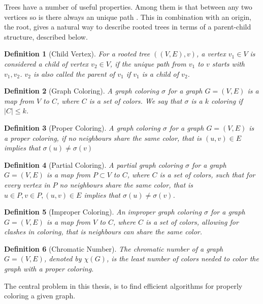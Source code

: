 \documentclass[a4paper]{article}
\newtheorem{definition}{Definition}[section]
\begin{document}
Trees have a number of useful properties. Among them is that between any two
vertices so is there always an unique path \cite{Trees}. This in combination
with an origin, the root, gives a natural way to describe rooted trees in terms
of a parent-child structure, described below.

\begin{definition}[Child Vertex]{\cite{Trees}}
    For a rooted tree $((V,E),v)$, a vertex $v_1 \in V$ is considered a child
    of vertex $v_2 \in V$, if the unique path from $v_1$ to $v$ starts with
    $v_1,v_2$. $v_2$ is also called the parent of $v_1$ if $v_1$ is a child 
    of $v_2$.
\end{definition}


\begin{definition}[Graph Coloring]
    A graph coloring $\sigma$ for a graph $G = (V,E)$ is a map from $V$ to $C$,
    where $C$ is a set of colors. We say that $\sigma$
    is a $k$ coloring if $|C| \leq k$.
\end{definition}

\begin{definition}[Proper Coloring]
    A graph coloring $\sigma$ for a graph $G = (V,E)$ is a proper coloring,
    if no neighbours share the same color,
    that is $(u,v) \in E$ implies that $\sigma(u) \neq \sigma(v)$
\end{definition}

\begin{definition}[Partial Coloring]{\cite{Constructive}}
    A partial graph coloring $\sigma$ for a graph $G = (V,E)$ is a map from $P \subset V$ to $C$,
    where $C$ is a set of colors, such that for every vertex in $P$ no neighbours 
    share the same color, that is $u \in P,v \in P, (u,v) \in E$  implies that $\sigma(u) \neq \sigma(v)$.
\end{definition}
\begin{definition}[Improper Coloring]{\cite{Constructive}}
    An improper graph coloring $\sigma$ for a graph $G = (V,E)$ is a map from
    $V$ to $C$, where $C$ is a set of colors, allowing for clashes in coloring,
    that is neighbours can share the same color.
\end{definition}
\begin{definition}[Chromatic Number]
    The chromatic number of a graph $G = (V,E)$, denoted by $\chi(G)$, is the
    least number of colors needed to color the graph with a proper coloring.
\end{definition}
The central problem in this thesis, is to find efficient algorithms 
for properly coloring a given graph.
\end{document}
